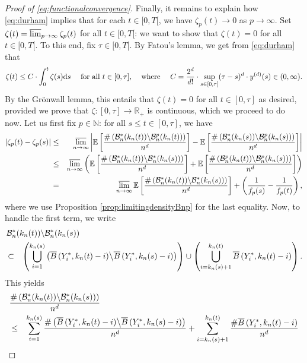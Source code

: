 \documentclass[a4paper,11pt]{article}
\begin{document}
\begin{proof}[Proof of \eqref{eq:functionalconvergence}]
Finally, it remains to explain how \eqref{eq:durham} implies that for each $t\in[0,T[$, we have $\zeta_p(t)\rightarrow0$ as $p\to\infty$.
Set $\zeta(t)=\varlimsup_{p\to\infty}\zeta_p(t)$ for all $t\in[0,T[$: we want to show that $\zeta(t)=0$ for all $t\in[0,T[$.
To this end, fix $\tau\in[0,T[$.
By Fatou's lemma, we get from \eqref{eq:durham} that
\[\text{$\zeta(t)\leq C\cdot\int_0^t\zeta(s)\mathrm{d}s$ \quad for all $t\in[0,\tau]$, \quad where \quad $C=\frac{2^d}{d!}\cdot\sup_{s\in[0,\tau]}(\tau-s)^d\cdot y^{(d)}(s)\in(0,\infty).$}\]
By the Grönwall lemma, this entails that $\zeta(t)=0$ for all $t\in[0,\tau]$ as desired, provided we prove that ${\zeta:[0,\tau]\rightarrow\mathbb{R}_+}$ is continuous, which we proceed to do now.
Let us first fix $p \in \mathbb{N}$: for all $s\leq t\in[0,\tau]$, we have
\begin{eqnarray*}
|\zeta_p(t)-\zeta_p(s)|&\leq&\varlimsup_{n\to\infty}\left|\mathbb{E}\left[\frac{\#\left(\mathcal{B}_n^*(k_n(t))\middle\backslash\mathcal{B}_n^p(k_n(t))\right)}{n^d}\right]-\mathbb{E}\left[\frac{\#\left(\mathcal{B}_n^*(k_n(s))\middle\backslash\mathcal{B}_n^p(k_n(s))\right)}{n^d}\right]\right|\\
&\leq&\varlimsup_{n\to\infty}\left(\mathbb{E}\left[\frac{\#\left(\mathcal{B}_n^*(k_n(t))\middle\backslash\mathcal{B}_n^*(k_n(s))\right)}{n^d}\right]+\mathbb{E}\left[\frac{\#\left(\mathcal{B}_n^p(k_n(t))\middle\backslash\mathcal{B}_n^p(k_n(s))\right)}{n^d}\right]\right)\\
&=&\varlimsup_{n\to\infty}\mathbb{E}\left[\frac{\#\left(\mathcal{B}_n^*(k_n(t))\middle\backslash\mathcal{B}_n^*(k_n(s))\right)}{n^d}\right]+\left(\frac{1}{f_p(s)}-\frac{1}{f_p(t)}\right),
\end{eqnarray*}
where we use Proposition \ref{prop:limitingdensityBnp} for the last equality.
Now, to handle the first term, we write
\begin{eqnarray*}
\lefteqn{\left.\mathcal{B}_n^*(k_n(t))\middle\backslash\mathcal{B}_n^*(k_n(s))\right.}\\
&\subset&\left(\bigcup_{i=1}^{k_n(s)}\left(\overline{B}\left(Y_i^*,k_n(t)-i\right)\middle\backslash\overline{B}\left(Y_i^*,k_n(s)-i\right)\right)\right)\cup\left(\bigcup_{i=k_n(s)+1}^{k_n(t)}\overline{B}\left(Y_i^*,k_n(t)-i\right)\right).
\end{eqnarray*}
This yields
\begin{eqnarray*}
\lefteqn{\frac{\#\left(\mathcal{B}_n^*(k_n(t))\middle\backslash\mathcal{B}_n^*(k_n(s))\right)}{n^d}}\\
&\leq&\sum_{i=1}^{k_n(s)}\frac{\#\left(\overline{B}\left(Y_i^*,k_n(t)-i\right)\middle\backslash\overline{B}\left(Y_i^*,k_n(s)-i\right)\right)}{n^d}+\sum_{i=k_n(s)+1}^{k_n(t)}\frac{\#\overline{B}\left(Y_i^*,k_n(t)-i\right)}{n^d}\\

\end{eqnarray*}
\end{proof}
\end{document}

